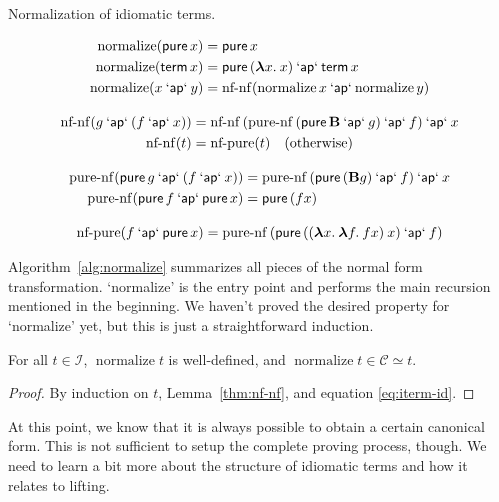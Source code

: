 \begin{algorithm}[t]
\caption{Normalization of idiomatic terms.}
\label{alg:normalize}
\begin{gather*}
	\begin{align*}
		\operatorname{normalize}(\operatorname{\mathsf{pure}} x) &= \operatorname{\mathsf{pure}} x \\
		\operatorname{normalize}(\operatorname{\mathsf{term}} x) &= \operatorname{\mathsf{pure}}{({\boldsymbol\lambda} x.\>x)} \mathbin{\mathsf{`ap`}} \operatorname{\mathsf{term}} x \\
		\operatorname{normalize}(x \mathbin{\mathsf{`ap`}} y) &=
			\operatorname{nf-nf}(\operatorname{normalize} x \mathbin{\mathsf{`ap`}} \operatorname{normalize} y)
	\end{align*} \\[2ex]
	\begin{align*}
		\operatorname{nf-nf}(g \mathbin{\mathsf{`ap`}} (f \mathbin{\mathsf{`ap`}} x)) &=
			\operatorname{nf-nf}{(\operatorname{pure-nf}{(\operatorname{\mathsf{pure}} \mathbf{B} \mathbin{\mathsf{`ap`}} g)} \mathbin{\mathsf{`ap`}} f)} \mathbin{\mathsf{`ap`}} x \\
		\operatorname{nf-nf}(t) &= \operatorname{nf-pure}(t) \quad\text{(otherwise)}
	\end{align*} \\[2ex]
	\begin{align*}
		\operatorname{pure-nf}(\operatorname{\mathsf{pure}} g \mathbin{\mathsf{`ap`}} (f \mathbin{\mathsf{`ap`}} x)) &=
			\operatorname{pure-nf}{(\operatorname{\mathsf{pure}}{(\mathbf{B} g)} \mathbin{\mathsf{`ap`}} f)} \mathbin{\mathsf{`ap`}} x \\
		\operatorname{pure-nf}(\operatorname{\mathsf{pure}} f \mathbin{\mathsf{`ap`}} \operatorname{\mathsf{pure}} x) &= \operatorname{\mathsf{pure}}{(f x)}
	\end{align*} \\[2ex]
	\operatorname{nf-pure}(f \mathbin{\mathsf{`ap`}} \operatorname{\mathsf{pure}} x) =
		\operatorname{pure-nf}{(\operatorname{\mathsf{pure}}{(({\boldsymbol\lambda} x.\>{\boldsymbol\lambda} f.\>f x) \> x)} \mathbin{\mathsf{`ap`}} f)}
\end{gather*}
\end{algorithm}

Algorithm~\ref{alg:normalize} summarizes all pieces of the normal form
transformation.
`normalize' is the entry point and performs the main recursion mentioned in the
beginning.
We haven't proved the desired property for `normalize' yet, but this is just a
straightforward induction.

\begin{lemma}\label{thm:normalize}
For all $t \in \mathcal{I}$, $\operatorname{normalize} t$ is well-defined, and
$\operatorname{normalize} t \in \mathcal{C} \simeq t$.
\end{lemma}
\begin{proof}
By induction on $t$, Lemma~\ref{thm:nf-nf}, and equation \eqref{eq:iterm-id}.
\end{proof}

At this point, we know that it is always possible to obtain a certain canonical
form.
This is not sufficient to setup the complete proving process, though.
We need to learn a bit more about the structure of idiomatic terms and how it
relates to lifting.

